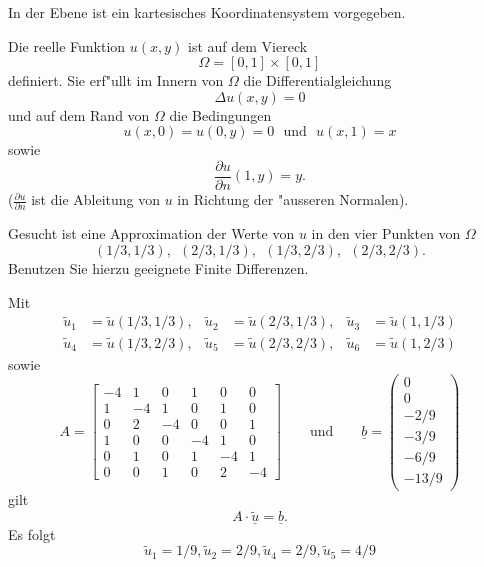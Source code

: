 In der Ebene ist ein kartesisches Koordinatensystem vorgegeben. 

\vspace{2mm}

Die reelle Funktion $u(x,y)$ ist auf dem Viereck
\[
\Omega = [0,1] \times [0,1]
\]
definiert. Sie erf"ullt im Innern von $\Omega$ die
Differentialgleichung 
\[
\Delta u(x,y) = 0
\]
und auf dem Rand von $\Omega$ die Bedingungen
\[
u(x,0) = u(0,y) = 0 \ \ \ \mbox{und} \ \ \ u(x,1) = x
\]
sowie
\[
\frac{\partial u}{\partial n}(1,y) = y.
\]
($\frac{\partial
u}{\partial n}$ ist die Ableitung von $u$ in Richtung der "ausseren
Normalen).

\vspace{2mm}

Gesucht ist eine Approximation der Werte von $u$ in den vier Punkten von
$\Omega$
\[
(1/3,1/3), \ \  (2/3,1/3), \ \ (1/3,2/3), \ \ (2/3,2/3).
\]
Benutzen Sie hierzu geeignete Finite Differenzen.

\begin{loesung}
Mit 
\begin{align*}
\tilde u_1&= \tilde u(1/3,1/3),&\tilde u_2&= \tilde u(2/3,1/3),&\tilde u_3&= \tilde u(1,1/3)\\
\tilde u_4&= \tilde u(1/3,2/3),&\tilde u_5&= \tilde u(2/3,2/3),&\tilde u_6&= \tilde u(1,2/3)
\end{align*}
sowie 
\[
A = \left[\begin{array}{rrrrrr} 
-4 & 1 & 0 & 1 & 0 & 0 \\
1 & -4 & 1 & 0 & 1 & 0 \\
0 & 2 & -4 & 0 & 0 & 1 \\
1 & 0 & 0 & -4 & 1 & 0 \\ 
0 & 1 & 0 & 1 & -4 & 1 \\
0 & 0 & 1 & 0 & 2 & -4 \end{array}\right]
\qquad 
\text{und}
\qquad
\underline{b} =  \left(\begin{array}{r} 0 \\ 0 \\ -2/9 \\ -3/9 \\ -6/9 \\ -13/9 \end{array}\right)
\]
gilt 
\[
A \cdot \underline{\tilde u} = \underline{b}.
\]
Es folgt 
\[
\tilde u_1 = 1/9, \tilde u_2 = 2/9, \tilde u_4 = 2/9, \tilde u_5 = 4/9
\]
\end{loesung}

